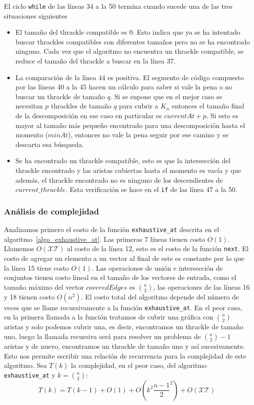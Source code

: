   El ciclo \texttt{while} de las líneas 34 a la 50 termina cuando sucede una de las tres situaciones siguientes
  \begin{itemize}
    \item El tamaño del thrackle compatible es 0. Esto indica que ya se ha intentado buscar thrackles compatibles con diferentes tamaños pero no se ha encontrado ninguno. Cada vez que el algoritmo no encuentra un thrackle compatible, se reduce el tamaño del thrackle a buscar en la línea 37.
    \item La comparación de la línea 44 es positiva. El segmento de código compuesto por las líneas 40 a la 45 hacen un cálculo para saber si vale la pena o no buscar un thrackle de tamaño $q$. Si se supone que en el mejor caso se necesitan $p$ thrackles de tamaño $q$ para cubrir a $K_n$ entonces el tamaño final de la descomposición en ese caso en particular es $currentAt + p$. Si esto es mayor al tamaño más pequeño encontrado para una descomposición hasta el momento ($minAt$), entonces no vale la pena seguir por ese camino y se descarta esa búsqueda.
    \item Se ha encontrado un thrackle compatible, esto es que la intersección del thrackle encontrado y las aristas cubiertas hasta el momento es vacía y que además, el thrackle encontrado no es ninguno de los descendientes de $current\_thrackle$. Esta verificación se hace en el \texttt{if} de las línea 47 a la 50.
  \end{itemize}
  \subsubsection{Análisis de complejidad}

  Analizamos primero el costo de la función \texttt{exhaustive\_at} descrita en el
  algoritmo~\ref{algo_exhaustive_at}. Las primeras 7 líneas tienen costo $O(1)$. Llamemos
  $O(\mathcal{XT})$ al costo de la línea 12, esto es el costo de la función \texttt{next}. El costo de
  agregar un elemento a un vector al final de este es constante por lo que la línea 15 tiene costo $O(1)$.
  Las operaciones de unión e intersección de conjuntos tienen costo lineal en el tamaño de los vectores de
  entrada, como el tamaño máximo del vector $coveredEdges$ es $\binom{n}{2}$, las operaciones de las líneas
  16 y 18 tienen costo $O(n^2)$. El costo total del algoritmo depende del número de veces que se llame
  recursivamente a la función \texttt{exhaustive\_at}. En el peor caso, en la primera llamada a la función
  tratamos de cubrir una gráfica con $\binom{n}{2}$ aristas y solo podemos cubrir una, es decir, encontramos un thrackle de tamaño uno, luego la llamada recursiva será para resolver un problema de $\binom{n}{2}-1$ aristas y de nuevo, encontramos un thrackle de tamaño uno y así sucesivamente. Esto nos permite escribir una relación de recurrencia para la complejidad de este algoritmo. Sea $T(k)$ la complejidad, en el peor caso, del algoritmo \texttt{exhaustive\_at} y $k=\binom{n}{2}$:
  \[ T(k) = T(k-1) + O(1) + O(k^2 \frac{n-1}{2}^2) + O(\mathcal{XT}) \]

